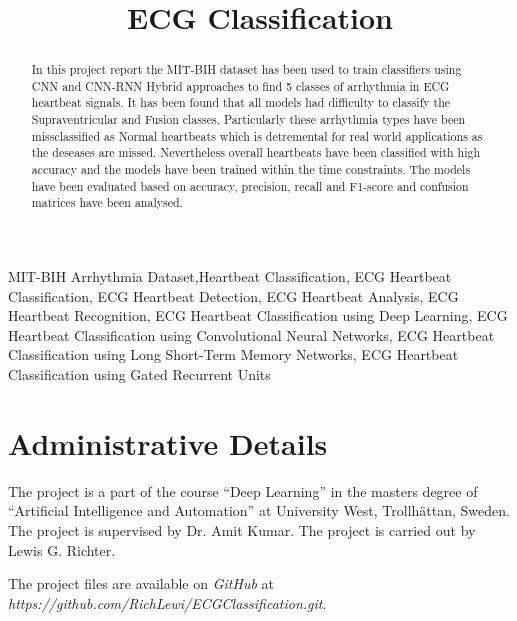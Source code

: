 \documentclass[conference]{IEEEtran}
\begin{document}
\title{ECG Classification}
\author{}

\maketitle

\begin{abstract}
In this project report the MIT-BIH dataset has been used to train classifiers using CNN and CNN-RNN Hybrid approaches to find 5 classes of arrhythmia in ECG heartbeat signals. It has been found that all models had difficulty to classify the Supraventricular and Fusion classes. Particularly these arrhythmia types have been missclassified as Normal heartbeats which is detremental for real world applications as the deseases are missed. Nevertheless overall heartbeats have been classified with high accuracy and the models have been trained within the time constraints. The models have been evaluated based on accuracy, precision, recall and F1-score and confusion matrices have been analysed. 
\end{abstract}

\begin{IEEEkeywords}
MIT-BIH Arrhythmia Dataset,Heartbeat Classification, ECG Heartbeat Classification, ECG Heartbeat Detection, ECG Heartbeat Analysis, ECG Heartbeat Recognition, ECG Heartbeat Classification using Deep Learning, ECG Heartbeat Classification using Convolutional Neural Networks, ECG Heartbeat Classification using Long Short-Term Memory Networks, ECG Heartbeat Classification using Gated Recurrent Units
\end{IEEEkeywords}

\section{Administrative Details}
The project is a part of the course ``Deep Learning'' in the masters degree of ``Artificial Intelligence and Automation'' at University West, Trollhättan, Sweden. The project is supervised by Dr. Amit Kumar. The project is carried out by Lewis G. Richter.

The project files are available on \textit{GitHub} at \textit{https://github.com/RichLewi/ECGClassification.git}.
\end{document}

